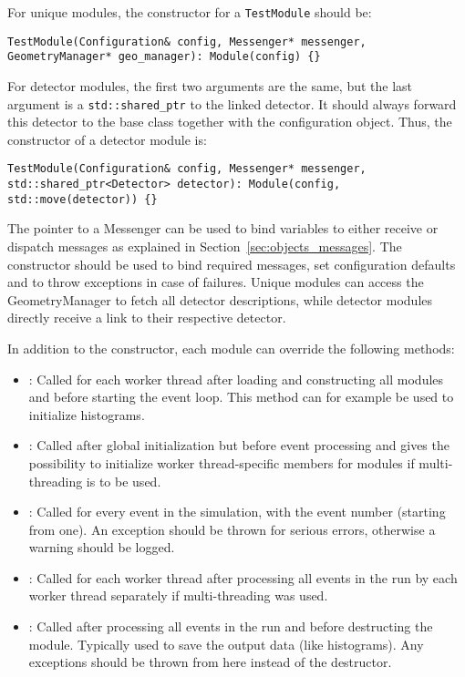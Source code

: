 For unique modules, the constructor for a \texttt{TestModule} should be:
\begin{verbatim}
TestModule(Configuration& config, Messenger* messenger, GeometryManager* geo_manager): Module(config) {}
\end{verbatim}

For detector modules, the first two arguments are the same, but the last argument is a \texttt{std::shared\_ptr} to the linked detector.
It should always forward this detector to the base class together with the configuration object.
Thus, the constructor of a detector module is:
\begin{verbatim}
TestModule(Configuration& config, Messenger* messenger, std::shared_ptr<Detector> detector): Module(config, std::move(detector)) {}
\end{verbatim}

The pointer to a Messenger can be used to bind variables to either receive or dispatch messages as explained in Section~\ref{sec:objects_messages}.
The constructor should be used to bind required messages, set configuration defaults and to throw exceptions in case of failures.
Unique modules can access the GeometryManager to fetch all detector descriptions, while detector modules directly receive a link to their respective detector.

In addition to the constructor, each module can override the following methods:
\begin{itemize}
\item {}: Called for each worker thread after loading and constructing all modules and before starting the event loop.
This method can for example be used to initialize histograms.
\item {}: Called after global initialization but before event processing and gives the possibility to initialize worker thread-specific members for modules if multi-threading is to be used.
\item {}: Called for every event in the simulation, with the event number (starting from one).
An exception should be thrown for serious errors, otherwise a warning should be logged.
\item {}: Called for each worker thread after processing all events in the run by each worker thread separately if multi-threading was used.
\item {}: Called after processing all events in the run and before destructing the module.
Typically used to save the output data (like histograms).
Any exceptions should be thrown from here instead of the destructor.
\end{itemize}

